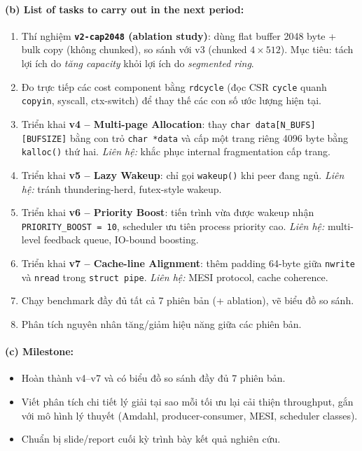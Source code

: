 \documentclass[11pt,a4paper]{article}
\begin{document}
\paragraph{(b) List of tasks to carry out in the next period:}
\begin{enumerate}
  \item Thí nghiệm \textbf{\texttt{v2-cap2048} (ablation study)}: dùng flat buffer 2048 byte + bulk copy (không chunked), so sánh với v3 (chunked $4 \times 512$). Mục tiêu: tách lợi ích do \emph{tăng capacity} khỏi lợi ích do \emph{segmented ring}.
  \item Đo trực tiếp các cost component bằng \texttt{rdcycle} (đọc CSR \texttt{cycle} quanh \texttt{copyin}, syscall, ctx-switch) để thay thế các con số ước lượng hiện tại.
  \item Triển khai \textbf{v4 -- Multi-page Allocation}: thay \texttt{char data[N\_BUFS][BUFSIZE]} bằng con trỏ \texttt{char *data} và cấp một trang riêng 4096 byte bằng \texttt{kalloc()} thứ hai. \emph{Liên hệ:} khắc phục internal fragmentation cấp trang.
  \item Triển khai \textbf{v5 -- Lazy Wakeup}: chỉ gọi \texttt{wakeup()} khi peer đang ngủ. \emph{Liên hệ:} tránh thundering-herd, futex-style wakeup.
  \item Triển khai \textbf{v6 -- Priority Boost}: tiến trình vừa được wakeup nhận \texttt{PRIORITY\_BOOST = 10}, scheduler ưu tiên process priority cao. \emph{Liên hệ:} multi-level feedback queue, IO-bound boosting.
  \item Triển khai \textbf{v7 -- Cache-line Alignment}: thêm padding 64-byte giữa \texttt{nwrite} và \texttt{nread} trong \texttt{struct pipe}. \emph{Liên hệ:} MESI protocol, cache coherence.
  \item Chạy benchmark đầy đủ tất cả 7 phiên bản (+ ablation), vẽ biểu đồ so sánh.
  \item Phân tích nguyên nhân tăng/giảm hiệu năng giữa các phiên bản.
\end{enumerate}

\paragraph{(c) Milestone:}
\begin{itemize}
  \item Hoàn thành v4--v7 và có biểu đồ so sánh đầy đủ 7 phiên bản.
  \item Viết phân tích chi tiết lý giải tại sao mỗi tối ưu lại cải thiện throughput, gắn với mô hình lý thuyết (Amdahl, producer-consumer, MESI, scheduler classes).
  \item Chuẩn bị slide/report cuối kỳ trình bày kết quả nghiên cứu.
\end{itemize}
\end{document}
